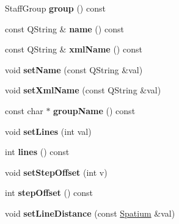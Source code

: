 \begin{DoxyCompactItemize}
Staff\+Group {\bfseries group} () const
\item 
\mbox{\label{class_ms_1_1_staff_type_ae367d18f45a59216ee787dbe0a1c62a7}} 
const Q\+String \& {\bfseries name} () const
\item 
\mbox{\label{class_ms_1_1_staff_type_a8cd22321b43b81ff1a69cde2eaf9bcc4}} 
const Q\+String \& {\bfseries xml\+Name} () const
\item 
\mbox{\label{class_ms_1_1_staff_type_a0a7165f6495c1815f8c762d2922a5016}} 
void {\bfseries set\+Name} (const Q\+String \&val)
\item 
\mbox{\label{class_ms_1_1_staff_type_a520fb3cb08122aa22bef5613795c75ee}} 
void {\bfseries set\+Xml\+Name} (const Q\+String \&val)
\item 
\mbox{\label{class_ms_1_1_staff_type_ab854ba4e2f9400f4985d0632bdef94c6}} 
const char $\ast$ {\bfseries group\+Name} () const
\item 
\mbox{\label{class_ms_1_1_staff_type_ac5c1add54774788d1dbd9f4b9c376c84}} 
void {\bfseries set\+Lines} (int val)
\item 
\mbox{\label{class_ms_1_1_staff_type_a1f3e57f97fb721dca79f75d6611f394c}} 
int {\bfseries lines} () const
\item 
\mbox{\label{class_ms_1_1_staff_type_ad6410eefbf6ecd2afe3dac4d9d3a7531}} 
void {\bfseries set\+Step\+Offset} (int v)
\item 
\mbox{\label{class_ms_1_1_staff_type_ae0ffb4991a51dd2715b6a7104f4caca3}} 
int {\bfseries step\+Offset} () const
\item 
\mbox{\label{class_ms_1_1_staff_type_a8022045d9faf269830cd669aa7cac2ed}} 
void {\bfseries set\+Line\+Distance} (const \hyperlink{class_ms_1_1_spatium}{Spatium} \&val)
\item 
\mbox{\label{class_ms_1_1_staff_type_a8573023e9149c33b1dc28e8e841e21ca}} 

\end{DoxyCompactItemize}
